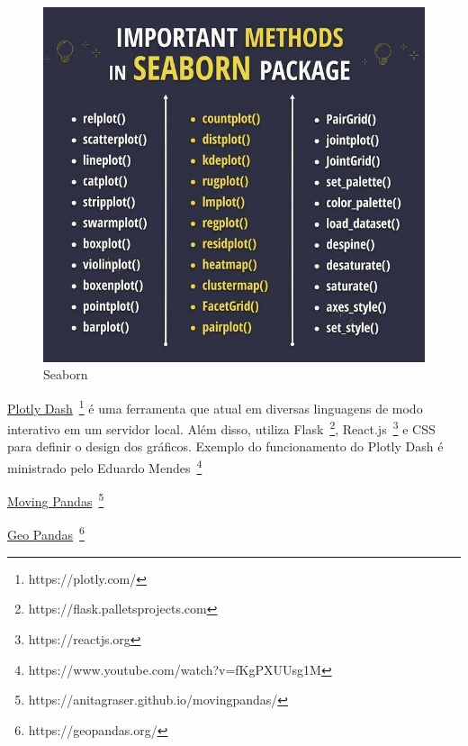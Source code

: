 \begin{figure}[!htp]
    \centering
    \includegraphics[scale=.5]{../img/python/seaborn.jpeg}
    \caption{Seaborn}
    \label{img:seaborn}
\end{figure}

\underline{Plotly Dash}~\footnote{https://plotly.com/} é uma ferramenta que atual em diversas linguagens de modo interativo em um servidor local.
Além disso, utiliza Flask~\footnote{https://flask.palletsprojects.com}, React.js~\footnote{https://reactjs.org} e CSS para definir o design dos gráficos.
Exemplo do funcionamento do Plotly Dash é ministrado pelo Eduardo Mendes~\footnote{https://www.youtube.com/watch?v=fKgPXUUsg1M}


\underline{Moving Pandas}~\footnote{https://anitagraser.github.io/movingpandas/}


\underline{Geo Pandas}~\footnote{https://geopandas.org/}